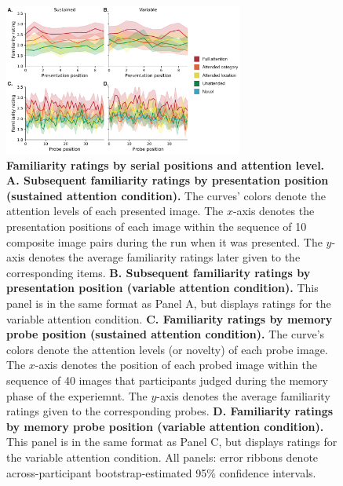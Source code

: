 \documentclass[english]{article}
\begin{document}
\begin{figure}[tp]
	\centering
	\includegraphics[width=0.7\textwidth]{figs/encoding_and_retrieval_timecourses}
  
  \caption{\textbf{Familiarity ratings by serial positions and attention
  level.} \textbf{A. Subsequent familiarity ratings by presentation position
  (sustained attention condition).} The curves' colors denote the attention
  levels of each presented image. The $x$-axis denotes the presentation
  positions of each image within the sequence of 10 composite image pairs
  during the run when it was presented. The $y$-axis denotes the average
  familiarity ratings later given to the corresponding items. \textbf{B.
  Subsequent familiarity ratings by presentation position (variable attention
  condition).} This panel is in the same format as Panel A, but displays
  ratings for the variable attention condition. \textbf{C. Familiarity ratings
  by memory probe position (sustained attention condition).} The curve's colors
  denote the attention levels (or novelty) of each probe image. The $x$-axis
  denotes the position of each probed image within the sequence of 40 images
  that participants judged during the memory phase of the experiemnt. The
  $y$-axis denotes the average familiarity ratings given to the corresponding
  probes. \textbf{D. Familiarity ratings by memory probe position (variable
  attention condition).} This panel is in the same format as Panel C, but
  displays ratings for the variable attention condition. All panels: error
  ribbons denote across-participant bootstrap-estimated 95\% confidence
  intervals.}
  
  \label{fig:timecourses}
  \end{figure}
\end{document}
